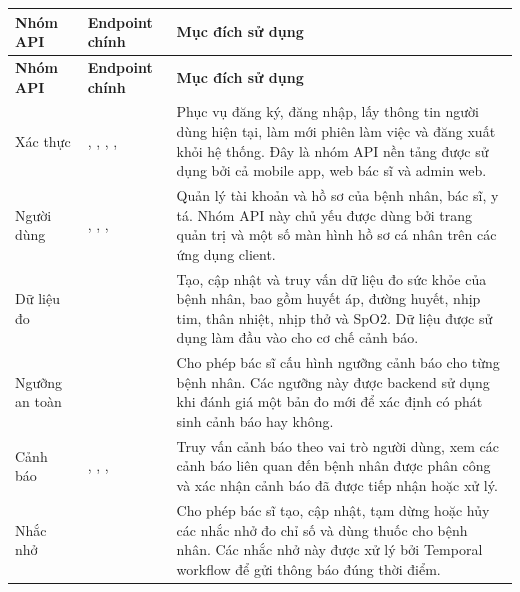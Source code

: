 \begin{center}
\renewcommand{\arraystretch}{1.3}
\footnotesize
\begin{longtable}{|L{3.0cm}|L{5.8cm}|L{6.4cm}|}
    \hline
    \textbf{Nhóm API} & \textbf{Endpoint chính} & \textbf{Mục đích sử dụng} \\
    \hline
    \endfirsthead
    \hline
    \textbf{Nhóm API} & \textbf{Endpoint chính} & \textbf{Mục đích sử dụng} \\
    \hline
    \endhead

    Xác thực &
    , , , ,  &
    Phục vụ đăng ký, đăng nhập, lấy thông tin người dùng hiện tại, làm mới phiên làm việc và đăng xuất khỏi hệ thống. Đây là nhóm API nền tảng được sử dụng bởi cả mobile app, web bác sĩ và admin web. \\
    \hline

    Người dùng &
    , , ,  &
    Quản lý tài khoản và hồ sơ của bệnh nhân, bác sĩ, y tá. Nhóm API này chủ yếu được dùng bởi trang quản trị và một số màn hình hồ sơ cá nhân trên các ứng dụng client. \\
    \hline

    Dữ liệu đo &
     &
    Tạo, cập nhật và truy vấn dữ liệu đo sức khỏe của bệnh nhân, bao gồm huyết áp, đường huyết, nhịp tim, thân nhiệt, nhịp thở và SpO2. Dữ liệu được sử dụng làm đầu vào cho cơ chế cảnh báo. \\
    \hline

    Ngưỡng an toàn &
     &
    Cho phép bác sĩ cấu hình ngưỡng cảnh báo cho từng bệnh nhân. Các ngưỡng này được backend sử dụng khi đánh giá một bản đo mới để xác định có phát sinh cảnh báo hay không. \\
    \hline

    Cảnh báo &
    , , ,  &
    Truy vấn cảnh báo theo vai trò người dùng, xem các cảnh báo liên quan đến bệnh nhân được phân công và xác nhận cảnh báo đã được tiếp nhận hoặc xử lý. \\
    \hline

    Nhắc nhở &
     &
    Cho phép bác sĩ tạo, cập nhật, tạm dừng hoặc hủy các nhắc nhở đo chỉ số và dùng thuốc cho bệnh nhân. Các nhắc nhở này được xử lý bởi Temporal workflow để gửi thông báo đúng thời điểm. \\
    \hline


\end{longtable}
\end{center}

